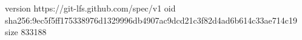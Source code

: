 version https://git-lfs.github.com/spec/v1
oid sha256:9ec5f5ff175338976d1329996db4907ac9dcd21c3f82d4ad6b614c33ae714c19
size 833188
